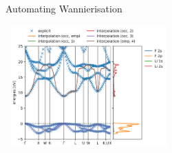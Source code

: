 \documentclass[xcolor=table,aspectratio=169]{beamer}
\numberwithin{equation}{section}
\begin{document}
\begin{frame}{Automating Wannierisation}
   \begin{center}
      \hbox{
         \includegraphics[width=0.45\textwidth]{figures/LiF_bandstructures/default.png}
      }
   \end{center}
\end{frame}
% 
% 
\end{document}
